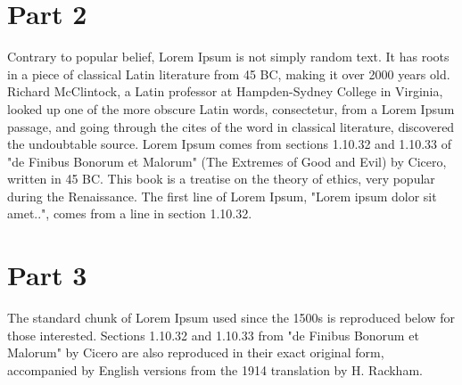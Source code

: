 \documentclass{article}
\begin{document}
\section{Part 2}

Contrary to popular belief, Lorem Ipsum is not simply random text. It has roots in a piece of classical Latin literature from 45 BC, making it over 2000 years old. Richard McClintock, a Latin professor at Hampden-Sydney College in Virginia, looked up one of the more obscure Latin words, consectetur, from a Lorem Ipsum passage, and going through the cites of the word in classical literature, discovered the undoubtable source. Lorem Ipsum comes from sections 1.10.32 and 1.10.33 of "de Finibus Bonorum et Malorum" (The Extremes of Good and Evil) by Cicero, written in 45 BC. This book is a treatise on the theory of ethics, very popular during the Renaissance. The first line of Lorem Ipsum, "Lorem ipsum dolor sit amet..", comes from a line in section 1.10.32.

\section{Part 3}

The standard chunk of Lorem Ipsum used since the 1500s is reproduced below for those interested. Sections 1.10.32 and 1.10.33 from "de Finibus Bonorum et Malorum" by Cicero are also reproduced in their exact original form, accompanied by English versions from the 1914 translation by H. Rackham.
\end{document}
